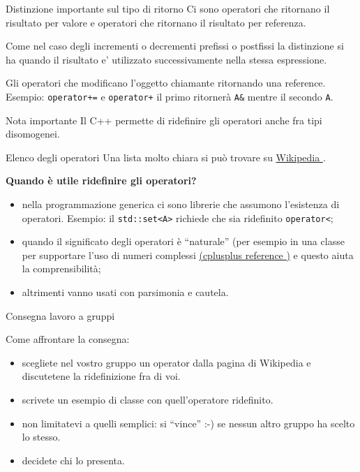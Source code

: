 \documentclass[xcolor={dvipsnames, svgnames, x11names, table}, 10pt]{beamer}
\begin{document}


\begin{frame}[fragile]{Distinzione importante sul tipo di ritorno}
Ci sono operatori che ritornano il risultato per valore e operatori che ritornano il risultato per referenza.

Come nel caso degli incrementi o decrementi prefissi o postfissi la distinzione si ha quando il risultato e’ utilizzato successivamente nella stessa espressione.

Gli operatori che modificano l'oggetto chiamante ritornando una reference.
Esempio: \texttt{operator+=} e \texttt{operator+} il primo ritornerà \texttt{A&} mentre il secondo \texttt{A}.

\begin{block}{Nota importante}
Il C++ permette di ridefinire gli operatori anche fra tipi disomogenei.
\end{block}
\end{frame}

\begin{frame}{Elenco degli operatori}
Una lista molto chiara si può trovare su \href{https://en.wikipedia.org/wiki/Operators\_in\_C\_and\_C\%2B\%2B}{Wikipedia \ExternalLink}.

\textbf{Quando è utile ridefinire gli operatori?}
\begin{itemize}[<+- | alert@+>]
    \item nella programmazione generica ci sono librerie che assumono l'esistenza di operatori. Esempio: il \texttt{std::set<A>} richiede che sia ridefinito \texttt{operator<};
    \item quando il significato degli operatori è \enquote{naturale} (per esempio in una classe per supportare l'uso di numeri complessi \href{https://www.cplusplus.com/reference/complex/complex/operators/}{(cplusplus reference \ExternalLink)} e questo aiuta la comprensibilità;
    \item altrimenti vanno usati con parsimonia e cautela.
\end{itemize}
\end{frame}

\begin{frame}{Consegna lavoro a gruppi}

Come affrontare la consegna:
\begin{itemize}
    \item scegliete nel vostro gruppo un operator dalla pagina di Wikipedia e discutetene la ridefinizione fra di voi.
    \item scrivete un esempio di classe con quell'operatore ridefinito.
    \item non limitatevi a quelli semplici: si \enquote{vince} :-) se nessun altro gruppo ha scelto lo stesso.
    \item decidete chi lo presenta.
\end{itemize}

\end{frame}

\Riconoscimenti
\end{document}
